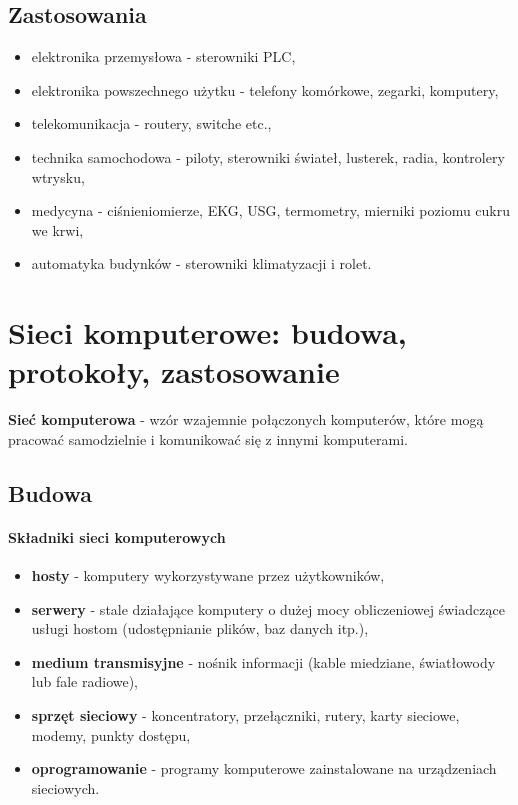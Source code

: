 \documentclass[a4paper,twoside]{report}
\begin{document}
\subsection{Zastosowania}
\begin{itemize}
\item elektronika przemysłowa - sterowniki PLC,
\item elektronika powszechnego użytku - telefony komórkowe, zegarki, komputery,
\item telekomunikacja - routery, switche etc.,
\item technika samochodowa - piloty, sterowniki świateł, lusterek, radia, kontrolery wtrysku,
\item medycyna - ciśnieniomierze, EKG, USG, termometry, mierniki poziomu cukru we krwi,
\item automatyka budynków - sterowniki klimatyzacji i rolet.
\end{itemize}

\section{Sieci komputerowe: budowa, protokoły, zastosowanie}

\textbf{Sieć komputerowa} - wzór wzajemnie połączonych komputerów, które mogą pracować samodzielnie i komunikować się z innymi komputerami.

\subsection{Budowa}

\paragraph{Składniki sieci komputerowych}
\begin{itemize}
\item \textbf{hosty} - komputery wykorzystywane przez użytkowników,
\item \textbf{serwery} - stale działające komputery o dużej mocy obliczeniowej świadczące usługi hostom (udostępnianie plików, baz danych itp.),
\item \textbf{medium transmisyjne} - nośnik informacji (kable miedziane, światłowody lub fale radiowe),
\item \textbf{sprzęt sieciowy} - koncentratory, przełączniki, rutery, karty sieciowe, modemy, punkty dostępu,
\item \textbf{oprogramowanie} - programy komputerowe zainstalowane na urządzeniach sieciowych.
\end{itemize}
\end{document}
